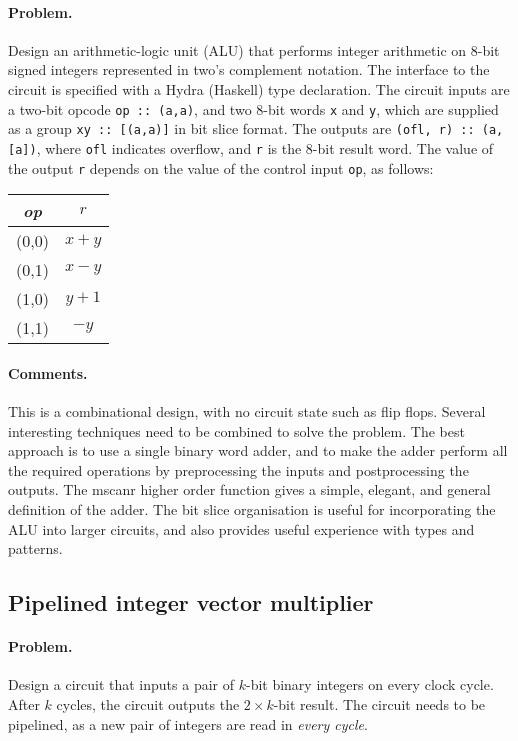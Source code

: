 \documentclass[submission,copyright,creativecommons]{eptcs}
\begin{document}
\paragraph{Problem.} Design an arithmetic-logic unit (ALU) that
performs integer arithmetic on 8-bit signed integers represented in
two's complement notation.  The interface to the circuit is
specified with a Hydra (Haskell) type declaration.  The circuit
inputs are a two-bit opcode \texttt{op :: (a,a)}, and two 8-bit
words \texttt{x} and \texttt{y}, which are supplied as a group
\texttt{xy :: [(a,a)]} in bit slice format.  The outputs are
\texttt{(ofl, r) :: (a, [a])}, where \texttt{ofl} indicates
overflow, and \texttt{r} is the 8-bit result word.  The value of
the output \texttt{r} depends on the value of the control input
\texttt{op}, as follows:
\begin{center}
\begin{tabular}{|c|c|}
\hline
  \textit{op} & $r$ \\
\hline
  (0,0) & $x+y$ \\
  (0,1) & $x-y$ \\
  (1,0) & $y+1$ \\
  (1,1) & $-y$ \\
\hline
\end{tabular}
\end{center}

\paragraph{Comments.}
This is a combinational design, with no circuit state such as flip
flops.  Several interesting techniques need to be combined to
solve the problem.  The best approach is to use a single binary
word adder, and to make the adder perform all the required
operations by preprocessing the inputs and postprocessing the
outputs.  The mscanr higher order function gives a simple, elegant,
and general definition of the adder.  The bit slice organisation is
useful for incorporating the ALU into larger circuits, and also
provides useful experience with types and patterns.

\subsection{Pipelined integer vector multiplier}

\paragraph{Problem.}
Design a circuit that inputs a pair of $k$-bit binary integers on
every clock cycle.  After $k$ cycles, the circuit outputs the $2
\times k$-bit result.  The circuit needs to be pipelined, as a new
pair of integers are read in \emph{every cycle}.
\end{document}
